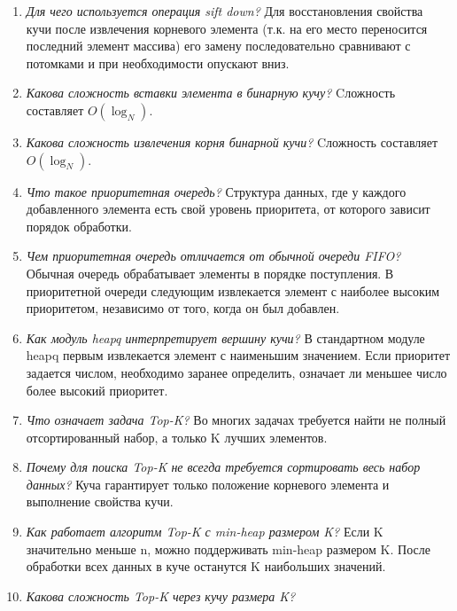 \begin{enumerate}
	\item \textit{Для чего используется операция sift down?}\newline
	Для восстановления свойства кучи после извлечения корневого элемента (т.к. на его место переносится последний элемент массива) его замену последовательно сравнивают с потомками и при необходимости опускают вниз.
	\item \textit{Какова сложность вставки элемента в бинарную кучу?}\newline
	Cложность составляет $O(\log_N)$.
	\item \textit{Какова сложность извлечения корня бинарной кучи?}\newline
	Cложность составляет $O(\log_N)$.
	\item \textit{Что такое приоритетная очередь?}\newline
	Структура данных, где у каждого добавленного элемента есть свой уровень приоритета, от которого зависит порядок обработки.
	\item \textit{Чем приоритетная очередь отличается от обычной очереди FIFO?}\newline
	Обычная очередь обрабатывает элементы в порядке поступления. В приоритетной очереди следующим извлекается элемент с наиболее высоким приоритетом, независимо от того, когда он был добавлен.
	\item \textit{Как модуль heapq интерпретирует вершину кучи?}\newline
	В стандартном модуле heapq первым извлекается элемент с наименьшим значением. Если приоритет задается числом, необходимо заранее определить, означает ли меньшее число более высокий приоритет.
	\item \textit{Что означает задача Top-K?}\newline
	Во многих задачах требуется найти не полный отсортированный набор, а только K лучших элементов.
	\item \textit{Почему для поиска Top-K не всегда требуется сортировать весь набор данных?}\newline
	Куча гарантирует только положение корневого элемента и выполнение свойства кучи.
	\item \textit{Как работает алгоритм Top-K с min-heap размером K?}\newline
	Если K значительно меньше n, можно поддерживать min-heap размером K. После обработки всех данных в куче останутся K наибольших значений.
	\item \textit{Какова сложность Top-K через кучу размера K?}\newline

\end{enumerate}
